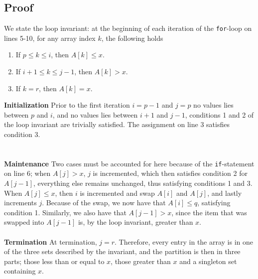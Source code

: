 \subsection{Proof}
We state the loop invariant: at the beginning of each iteration of the
\texttt{for}-loop on lines 5-10, for any array index $k$, the following
holds
\begin{enumerate}
	\item If $p \leq k \leq i$, then $A[k] \leq x$.
	\item If $i + 1 \leq k \leq j - 1$, then $A[k] > x$.
	\item If $k = r$, then $A[k] = x$.
\end{enumerate}
\noindent \textbf{Initialization} Prior to the first iteration $i = p - 1$ and
$j = p$ no values lies between $p$ and $i$, and no values lies between $i + 1$
and $j - 1$, conditions 1 and 2 of the loop invariant are trivially
satisfied. The assignment on line 3 satisfies condition 3. \\
\\\\
\noindent \textbf{Maintenance} Two cases must be accounted for here because of
the \texttt{if}-statement on line 6; when $A[j] > x$, $j$ is incremented,
which then satisfies condition 2 for $A[j - 1]$, everything else remains
unchanged, thus satisfying conditions 1 and 3. When $A[j] \leq x$, then $i$ is
incremented and swap $A[i]$ and $A[j]$, and lastly increments $j$. Because of
the swap, we now have that $A[i] \leq q$, satisfying condition 1. Similarly,
we also have that $A[j - 1] > x$, since the item that was swapped into
$A[j - 1]$ is, by the loop invariant, greater than $x$.
\\\\
\noindent \textbf{Termination} At termination, $j = r$. Therefore, every entry
in the array is in one of the three sets described by the invariant, and the
partition is then in three parts; those less than or equal to $x$, those
greater than $x$ and a singleton set containing $x$.

\newpage
